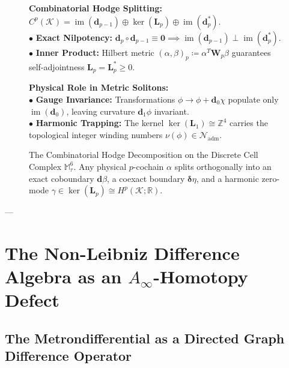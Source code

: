 \documentclass[
    12pt,
    a4paper,
    headings=normal,
    twoside=false,
    open=any,
    parskip=half
]{scrbook}
\newcommand{\spectrumN}{\mathcal{N}_{\text{adm}}}
\begin{document}
\begin{figure}[htbp]
\begin{tcolorbox}[colback=white, colframe=secondarycolor!70, arc=2mm, boxrule=0.7pt, left=6pt, right=6pt, top=4pt, bottom=4pt, width=\linewidth]
\scriptsize\sffamily
\begin{minipage}[t]{0.48\textwidth}
  \textbf{\color{maincolor}Combinatorial Hodge Splitting:}\\[1pt]
  $C^p(\mathcal{K}) = \operatorname{im}(\mathbf{d}_{p-1}) \oplus \ker(\mathbf{L}_p) \oplus \operatorname{im}(\mathbf{d}_p^*)$.\\[2pt]
  $\bullet$ \textbf{Exact Nilpotency:} $\mathbf{d}_p \circ \mathbf{d}_{p-1} \equiv \mathbf{0} \implies \operatorname{im}(\mathbf{d}_{p-1}) \perp \operatorname{im}(\mathbf{d}_p^*)$.\\[1pt]
  $\bullet$ \textbf{Inner Product:} Hilbert metric $(\alpha, \beta)_p \coloneqq \alpha^T \mathbf{W}_p \beta$ guarantees self-adjointness $\mathbf{L}_p = \mathbf{L}_p^* \ge 0$.
\end{minipage}\hfill
\begin{minipage}[t]{0.48\textwidth}
  \textbf{\color{accentcolor}Physical Role in Metric Solitons:}\\[1pt]
  $\bullet$ \textbf{Gauge Invariance:} Transformations $\phi \to \phi + \mathbf{d}_0 \chi$ populate only $\operatorname{im}(\mathbf{d}_0)$, leaving curvature $\mathbf{d}_1 \phi$ invariant.\\[1pt]
  $\bullet$ \textbf{Harmonic Trapping:} The kernel $\ker(\mathbf{L}_1) \cong \mathbb{Z}^4$ carries the topological integer winding numbers $\nu(\phi) \in \spectrumN$.
\end{minipage}
\end{tcolorbox}
\vspace{-2mm}
\caption{The Combinatorial Hodge Decomposition on the Discrete Cell Complex $\mathbb{M}_\tau^6$. Any physical $p$-cochain $\alpha$ splits orthogonally into an exact coboundary $\mathbf{d}\beta$, a coexact boundary $\boldsymbol{\delta}\eta$, and a harmonic zero-mode $\gamma \in \ker(\mathbf{L}_p) \cong H^p(\mathcal{K}; \mathbb{R})$.}
\label{fig:ch1_hodge_decomposition_spaces}
\end{figure}

---

\section{The Non-Leibniz Difference Algebra as an \texorpdfstring{$A_\infty$}{A-infinity}-Homotopy Defect}
\label{sec:ch1_non_leibniz_algebra}

\subsection{The Metrondifferential as a Directed Graph Difference Operator}
\end{document}
